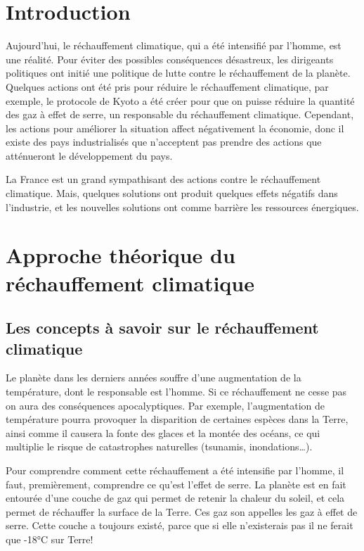 \documentclass[a4paper,11pt]{article}
\begin{document}
\titleTMB 
\newpage
\tableofcontents
\newpage

\section*{Introduction}

Aujourd'hui, le réchauffement climatique, qui  a été intensifié par l’homme, est
une réalité.
Pour éviter des possibles conséquences désastreux, les dirigeants politiques ont
initié une politique de lutte contre le réchauffement de la planète. 
Quelques  actions ont  été pris  pour réduire  le réchauffement  climatique, par
exemple,  le protocole  de  Kyoto a  été créer  pour  que on  puisse réduire  la
quantité  des   gaz  à   effet  de  serre,   un  responsable   du  réchauffement
climatique.  Cependant,  les   actions  pour  améliorer  la  situation  affect
négativement la économie, donc il existe des pays industrialisés que n’acceptent
pas prendre des actions que atténueront le développement du pays.

La  France  est  un  grand  sympathisant des  actions  contre  le  réchauffement
climatique. Mais,  quelques solutions ont produit quelques  effets négatifs dans
l’industrie,  et  les nouvelles  solutions  ont  comme  barrière les  ressources
énergiques.


\section{Approche théorique du réchauffement climatique}
\subsection{Les concepts à savoir sur le réchauffement climatique}

Le  planète  dans   les  derniers  années  souffre  d'une   augmentation  de  la
température, dont le responsable est l'homme. Si ce réchauffement ne cesse pas
on  aura  des  conséquences   apocalyptiques.  Par  exemple,  l'augmentation  de
température pourra provoquer la disparition  de certaines espèces dans la Terre,
ainsi comme  il causera  la fonte  des glaces et  la montée  des océans,  ce qui
multiplie le risque de catastrophes naturelles (tsunamis, inondations…).



Pour comprendre  comment cette  réchauffement a été  intensifie par  l'homme, il
faut, premièrement, comprendre ce qu’est l’effet de serre. 
La planète est en fait entourée d’une couche de gaz qui permet de retenir la
chaleur du soleil, et cela permet de  réchauffer la surface de la Terre. Ces gaz
son appelles les gaz à effet de serre. 
Cette couche a toujours existé, parce  que si elle n'existerais pas il ne ferait
que -18°C sur Terre!
\end{document}
